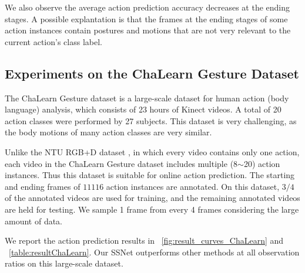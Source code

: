 \documentclass[10pt,twocolumn,letterpaper]{article}
\begin{document}
We also observe the average action prediction accuracy decreases at the ending stages.
A possible explantation is that the frames at the ending stages of some action instances contain postures and motions that are not very relevant to the current action's class label.

\subsection{Experiments on the ChaLearn Gesture Dataset}


The ChaLearn Gesture dataset \cite{escalera2013multi} is a large-scale dataset for human action (body language) analysis,
which consists of 23 hours of Kinect videos.
A total of 20 action classes were performed by 27 subjects.
This dataset is very challenging, as the body motions of many action classes are very similar.


Unlike the NTU RGB+D dataset \cite{Shahroudy_2016_CVPR}, in which every video contains only one action,
each video in the ChaLearn Gesture dataset includes multiple (8$\sim$20) action instances.
Thus this dataset is suitable for online action prediction.
The starting and ending frames of $11116$ action instances are annotated.
On this dataset, $3/4$ of the annotated videos are used for training,
and the remaining annotated videos are held for testing.
We sample 1 frame from every 4 frames considering the large amount of data.

We report the action prediction results in \figurename{~\ref{fig:result_curves_ChaLearn}} and \tablename{~\ref{table:resultChaLearn}}.
Our SSNet outperforms other methods at all observation ratios on this large-scale dataset.
\end{document}
